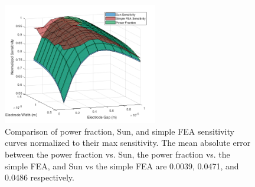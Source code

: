 \begin{figure}[h]
    \centering
    \includegraphics[width=0.6\textwidth]{images/normalizedSensitivityComp.png}
    \caption{Comparison of power fraction, Sun, and simple FEA sensitivity curves normalized to their max sensitivity. The mean absolute error between the power fraction vs. Sun, the power fraction vs. the simple FEA, and Sun vs the simple FEA are 0.0039, 0.0471, and 0.0486 respectively.}
    \label{fig:my_label}
\end{figure}

